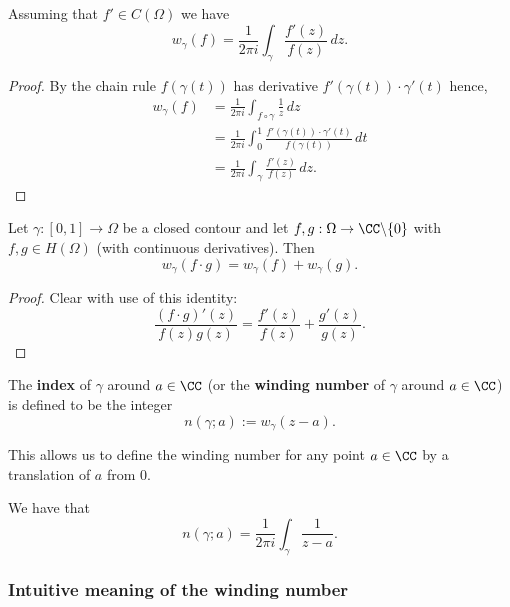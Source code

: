 \documentclass[12pt, a4paper]{article}
\begin{document}
\begin{mdcor}
    Assuming that \(f' \in C(\Omega)\) we have 
    \[w_{\gamma}(f) = \frac{1}{2\pi i} \int_{\gamma} \frac{f'(z)}{f(z)} \, dz.\]
\end{mdcor}

\begin{proof}
    By the chain rule \(f(\gamma(t))\) has derivative \(f'(\gamma(t)) \cdot \gamma'(t)\) hence,
    \[\begin{aligned}
        w_{\gamma}(f) &= \frac{1}{2\pi i} \int_{f \circ \gamma} \frac{1}{z} \, dz \\
        &= \frac{1}{2\pi i} \int_{0}^{1} \frac{f'(\gamma(t)) \cdot \gamma'(t)}{f(\gamma(t))} \, dt \\
        &= \frac{1}{2\pi i} \int_{\gamma} \frac{f'(z)}{f(z)} \, dz.
    \end{aligned}\]
\end{proof}

\begin{mdprop}
    Let \(\gamma:[0,1] \to \Omega\) be a closed contour and let \(f,g : \Omega \to \CC \backslash \{0\}\) with \(f,g \in H(\Omega)\) (with continuous derivatives). Then
    \[w_{\gamma}(f \cdot g) = w_{\gamma}(f) + w_{\gamma}(g).\]
\end{mdprop}

\begin{proof}
    Clear with use of this identity:
    \[\frac{(f\cdot g)'(z)}{f(z)g(z)} = \frac{f'(z)}{f(z)}+\frac{g'(z)}{g(z)}.\]
\end{proof}

\begin{definition}
    The \textbf{index} of \(\gamma\) around \(a \in \CC\) (or the \textbf{winding number} of \(\gamma\) around \(a \in \CC\)) is defined to be the integer 
    \[n(\gamma;a):= w_{\gamma}(z-a).\]
\end{definition}

\begin{mdnote}
    This allows us to define the winding number for any point \(a \in \CC\) by a translation of \(a\) from \(0\).
\end{mdnote}

\begin{mdcor}
    We have that
    \[n(\gamma;a) = \frac{1}{2\pi i} \int_{\gamma} \frac{1}{z-a}.\]
\end{mdcor}

\subsubsection{Intuitive meaning of the winding number}
\end{document}
